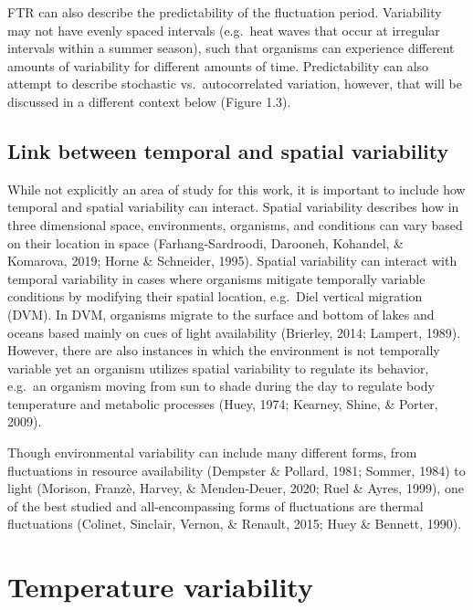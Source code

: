 \documentclass[12pt,twoside]{reedthesis}
\begin{document}
FTR can also describe the predictability of the fluctuation period. Variability may not have evenly spaced intervals (e.g.~heat waves that occur at irregular intervals within a summer season), such that organisms can experience different amounts of variability for different amounts of time. Predictability can also attempt to describe stochastic vs.~autocorrelated variation, however, that will be discussed in a different context below (Figure 1.3).

\hypertarget{link-between-temporal-and-spatial-variability}{%
\subsection{Link between temporal and spatial variability}\label{link-between-temporal-and-spatial-variability}}

While not explicitly an area of study for this work, it is important to include how temporal and spatial variability can interact. Spatial variability describes how in three dimensional space, environments, organisms, and conditions can vary based on their location in space (Farhang-Sardroodi, Darooneh, Kohandel, \& Komarova, 2019; Horne \& Schneider, 1995). Spatial variability can interact with temporal variability in cases where organisms mitigate temporally variable conditions by modifying their spatial location, e.g.~Diel vertical migration (DVM). In DVM, organisms migrate to the surface and bottom of lakes and oceans based mainly on cues of light availability (Brierley, 2014; Lampert, 1989). However, there are also instances in which the environment is not temporally variable yet an organism utilizes spatial variability to regulate its behavior, e.g.~an organism moving from sun to shade during the day to regulate body temperature and metabolic processes (Huey, 1974; Kearney, Shine, \& Porter, 2009).

Though environmental variability can include many different forms, from fluctuations in resource availability
(Dempster \& Pollard, 1981; Sommer, 1984) to light (Morison, Franzè, Harvey, \& Menden‐Deuer, 2020; Ruel \& Ayres, 1999), one of the best studied and all-encompassing forms of fluctuations are thermal fluctuations (Colinet, Sinclair, Vernon, \& Renault, 2015; Huey \& Bennett, 1990).

\hypertarget{temperature-variability}{%
\section{Temperature variability}\label{temperature-variability}}
\end{document}
